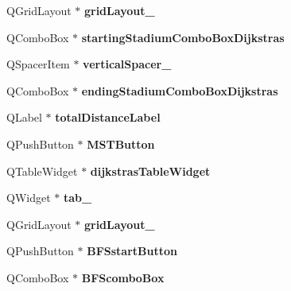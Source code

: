 \begin{DoxyCompactItemize}
Q\+Grid\+Layout $\ast$ {\bfseries grid\+Layout\+\_}
\item 
\mbox{\label{class_ui___main_window_ad31ec710cdca8618307abae590dfd10c}} 
Q\+Combo\+Box $\ast$ {\bfseries starting\+Stadium\+Combo\+Box\+Dijkstras}
\item 
\mbox{\label{class_ui___main_window_ac845bdf6b5b5237378a7b067808b7a31}} 
Q\+Spacer\+Item $\ast$ {\bfseries vertical\+Spacer\+\_}
\item 
\mbox{\label{class_ui___main_window_a1d094ac9c7dd9721830954c8f772aa88}} 
Q\+Combo\+Box $\ast$ {\bfseries ending\+Stadium\+Combo\+Box\+Dijkstras}
\item 
\mbox{\label{class_ui___main_window_a3e42cf31133f6fb31d515d9b796b97c7}} 
Q\+Label $\ast$ {\bfseries total\+Distance\+Label}
\item 
\mbox{\label{class_ui___main_window_a022f71e3fc368ec7ce1e1a3a020f999a}} 
Q\+Push\+Button $\ast$ {\bfseries M\+S\+T\+Button}
\item 
\mbox{\label{class_ui___main_window_a903d613fd69c321aa4d62393b1d6b2a5}} 
Q\+Table\+Widget $\ast$ {\bfseries dijkstras\+Table\+Widget}
\item 
\mbox{\label{class_ui___main_window_a83495b23cbc6810f81978dc0d584b810}} 
Q\+Widget $\ast$ {\bfseries tab\+\_}
\item 
\mbox{\label{class_ui___main_window_ad113cf7b76aaf178473555bdf64ff035}} 
Q\+Grid\+Layout $\ast$ {\bfseries grid\+Layout\+\_}
\item 
\mbox{\label{class_ui___main_window_af5155151e977b03494f1110b104082a3}} 
Q\+Push\+Button $\ast$ {\bfseries B\+F\+Sstart\+Button}
\item 
\mbox{\label{class_ui___main_window_ae4f6eb4c5b87c3f967b47d095d77d886}} 
Q\+Combo\+Box $\ast$ {\bfseries B\+F\+Scombo\+Box}
\item 
\mbox{\label{class_ui___main_window_a7d149fab4ef6b1172c18d0cc73773113}} 

\end{DoxyCompactItemize}
